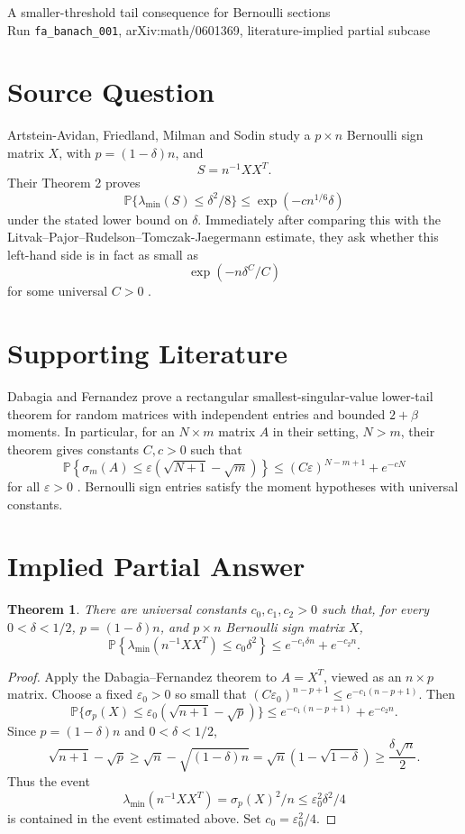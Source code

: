 \documentclass[11pt]{article}
\newtheorem{theorem}{Theorem}
\newcommand{\PP}{\mathbb P}
\begin{document}
\begin{center}
{\Large A smaller-threshold tail consequence for Bernoulli sections}\\[0.5em]
{\small Run \texttt{fa\_banach\_001}, arXiv:math/0601369, literature-implied partial subcase}
\end{center}

\section*{Source Question}

Artstein-Avidan, Friedland, Milman and Sodin study a \(p\times n\)
Bernoulli sign matrix \(X\), with \(p=(1-\delta)n\), and
\[
  S=n^{-1}XX^T .
\]
Their Theorem 2 proves
\[
  \PP\{\lambda_{\min}(S)\leq \delta^2/8\}
  \leq \exp(-c n^{1/6}\delta)
\]
under the stated lower bound on \(\delta\).  Immediately after comparing
this with the Litvak--Pajor--Rudelson--Tomczak-Jaegermann estimate, they ask
whether this left-hand side is in fact as small as
\[
  \exp(-n\delta^C/C)
\]
for some universal \(C>0\) \cite{AFMS}.

\section*{Supporting Literature}

Dabagia and Fernandez prove a rectangular smallest-singular-value lower-tail
theorem for random matrices with independent entries and bounded
\(2+\beta\) moments.  In particular, for an \(N\times m\) matrix \(A\) in
their setting, \(N>m\), their theorem gives constants \(C,c>0\) such that
\[
  \PP\left\{\sigma_m(A)\leq
    \varepsilon(\sqrt{N+1}-\sqrt m)\right\}
  \leq (C\varepsilon)^{N-m+1}+e^{-cN}
\]
for all \(\varepsilon>0\) \cite{DF}.  Bernoulli sign entries satisfy the
moment hypotheses with universal constants.

\section*{Implied Partial Answer}

\begin{theorem}
There are universal constants \(c_0,c_1,c_2>0\) such that, for every
\(0<\delta<1/2\), \(p=(1-\delta)n\), and \(p\times n\) Bernoulli sign matrix
\(X\),
\[
  \PP\left\{\lambda_{\min}\left(n^{-1}XX^T\right)\leq c_0\delta^2\right\}
  \leq e^{-c_1\delta n}+e^{-c_2 n}.
\]
\end{theorem}

\begin{proof}
Apply the Dabagia--Fernandez theorem to \(A=X^T\), viewed as an \(n\times p\)
matrix.  Choose a fixed \(\varepsilon_0>0\) so small that
\((C\varepsilon_0)^{n-p+1}\leq e^{-c_1(n-p+1)}\).  Then
\[
  \PP\{\sigma_p(X)\leq
  \varepsilon_0(\sqrt{n+1}-\sqrt p)\}
  \leq e^{-c_1(n-p+1)}+e^{-c_2n}.
\]
Since \(p=(1-\delta)n\) and \(0<\delta<1/2\),
\[
  \sqrt{n+1}-\sqrt p\geq \sqrt n-\sqrt{(1-\delta)n}
  = \sqrt n(1-\sqrt{1-\delta})\geq \frac{\delta\sqrt n}{2}.
\]
Thus the event
\[
  \lambda_{\min}(n^{-1}XX^T)=\sigma_p(X)^2/n
  \leq \varepsilon_0^2\delta^2/4
\]
is contained in the event estimated above.  Set
\(c_0=\varepsilon_0^2/4\).
\end{proof}
\end{document}
